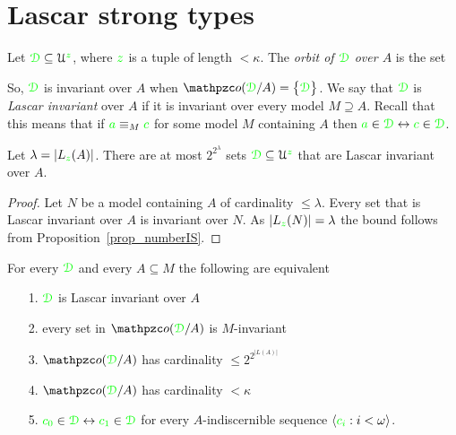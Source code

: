 \section{Lascar strong types}
\label{Lst}
\def\equivL{\stackrel{\smash{\scalebox{.5}{\rm L}}}{\equiv}}


Let ${\color{green}\EuScript D}\subseteq\EuScript U^{\color{green} z}$, where ${\color{green} z}$ is a tuple of length $<\kappa$.
The \emph{orbit of ${\color{green}\EuScript D}$ over $A$\/} is the set


So, ${\color{green}\EuScript D}$ is invariant over $A$ when $\oorbit(\grD/A)=\big\{\grD\big\}$.
We say that ${\color{green}\EuScript D}$ is \emph{Lascar invariant\/} over $A$ if it is invariant over every model $M\supseteq A$.
Recall that this means that if ${\color{green} a}\equiv_M{\color{green} c}$ for some model $M$ containing $A$ then ${\color{green} a}\in{\color{green}\EuScript D}\leftrightarrow{\color{green}c}\in{\color{green}\EuScript D}$.


\begin{proposition}\label{prop_numero_quasi_invarianti}
  Let $\lambda=|L_{\color{green} z}(A)|$.
There are at most $2^{2^{\lambda}}$ sets ${\color{green}\EuScript D}\subseteq\EuScript U^{\color{green} z}$ that are Lascar invariant over $A$.
\end{proposition}

\begin{proof}
  Let $N$ be a model containing $A$ of cardinality $\le\lambda$.
Every set that is Lascar invariant over $A$ is invariant over $N$.
As $|L_{\color{green} z}(N)|=\lambda$ the bound follows from Proposition~\ref{prop_numberIS}.
\end{proof}

\begin{theorem}\label{thm_Lascar_indiscernibles}
  For every ${\color{green}\EuScript D}$ and every $A\subseteq M$ the following are equivalent
  \begin{itemize}
    \item[1.] ${\color{green}\EuScript D}$ is Lascar invariant over $A$
    \item[2.] every set in $\oorbit(\grD/A)$ is $M\mbox{-}$invariant
    \item[3.] $\oorbit(\grD/A)$ has cardinality $\le 2^{2^{|L(A)|}}$
    \item[4.] $\oorbit(\grD/A)$ has cardinality $<\kappa$
    \item[5.] ${\color{green} c_0}\in{\color{green}\EuScript D}\leftrightarrow{\color{green}c_1}\in{\color{green}\EuScript D}$ for every $A\mbox{-}$indiscernible sequence $\langle{\color{green}c_i}:i<\omega\rangle$.
  \end{itemize}
\end{theorem}

